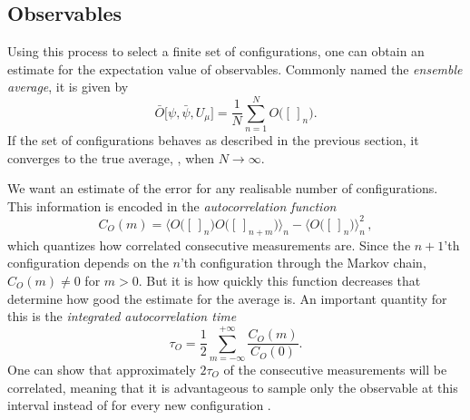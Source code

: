 \subsection{Observables}

Using this process to select a finite set of configurations, one can
obtain an estimate for the expectation value of observables. 
Commonly named the \emph{ensemble average}, it is given by
%
\begin{equation}
  \bar{O}\big[\psi, \bar{\psi}, U_{\mu}\big] = \frac{1}{N} \sum_{n = 1}^N O\big( [\,]_n \big).
\end{equation}
%
If the set of configurations behaves as described in the previous section, it
converges to the true average, , when $N \to
\infty$.

We want an estimate of the error for any realisable number of configurations.
This information is encoded in the \emph{autocorrelation function}
%
\begin{equation}
  C_{O}(m) = \big\langle O\big([\,]_n\big) O\big([\,]_{n+m}\big)\big\rangle_n
    - \big\langle O\big([\,]_n\big)\big\rangle_n^2\,,
\end{equation}
%
which quantizes how correlated consecutive measurements are. Since the $n+1$'th
configuration depends on the $n$'th configuration through the Markov chain,
$C_O(m) \neq 0$ for $m > 0$. But it is how quickly this function decreases that
determine how good the estimate for the average is. An important quantity for
this is the \emph{integrated autocorrelation time}
%
\begin{equation}
  \tau_O = \frac{1}{2} \sum_{m=-\infty}^{+\infty} \frac{C_O(m)}{C_O(0)}.
\end{equation}
%
One can show that approximately $2 \tau_O$ of the consecutive measurements will
be correlated, meaning that it is advantageous to sample only the
observable at this interval instead of for every new configuration
\citep[sect. 7.1.3]{montvay1997quantum}.
